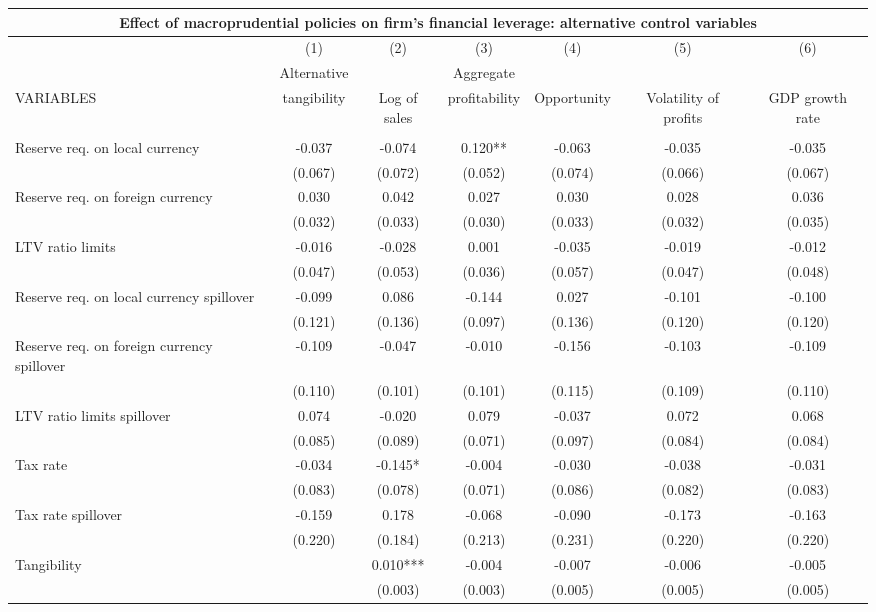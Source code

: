 \begin{tabular}{lcccccc}
\multicolumn{7}{c}{Effect of macroprudential policies on firm's financial leverage: alternative control variables} \\ \hline
 & (1) & (2) & (3) & (4) & (5) & (6) \\
 & Alternative &  & Aggregate &  &  &  \\
VARIABLES & tangibility & Log of sales & profitability & Opportunity & Volatility of profits & GDP growth rate \\ \hline
 &  &  &  &  &  &  \\
Reserve req. on local currency & -0.037 & -0.074 & 0.120** & -0.063 & -0.035 & -0.035 \\
 & (0.067) & (0.072) & (0.052) & (0.074) & (0.066) & (0.067) \\
Reserve req. on foreign currency & 0.030 & 0.042 & 0.027 & 0.030 & 0.028 & 0.036 \\
 & (0.032) & (0.033) & (0.030) & (0.033) & (0.032) & (0.035) \\
LTV ratio limits & -0.016 & -0.028 & 0.001 & -0.035 & -0.019 & -0.012 \\
 & (0.047) & (0.053) & (0.036) & (0.057) & (0.047) & (0.048) \\
Reserve req. on local currency spillover & -0.099 & 0.086 & -0.144 & 0.027 & -0.101 & -0.100 \\
 & (0.121) & (0.136) & (0.097) & (0.136) & (0.120) & (0.120) \\
Reserve req. on foreign currency spillover & -0.109 & -0.047 & -0.010 & -0.156 & -0.103 & -0.109 \\
 & (0.110) & (0.101) & (0.101) & (0.115) & (0.109) & (0.110) \\
LTV ratio limits spillover & 0.074 & -0.020 & 0.079 & -0.037 & 0.072 & 0.068 \\
 & (0.085) & (0.089) & (0.071) & (0.097) & (0.084) & (0.084) \\
Tax rate & -0.034 & -0.145* & -0.004 & -0.030 & -0.038 & -0.031 \\
 & (0.083) & (0.078) & (0.071) & (0.086) & (0.082) & (0.083) \\
Tax rate spillover & -0.159 & 0.178 & -0.068 & -0.090 & -0.173 & -0.163 \\
 & (0.220) & (0.184) & (0.213) & (0.231) & (0.220) & (0.220) \\
Tangibility &  & 0.010*** & -0.004 & -0.007 & -0.006 & -0.005 \\
 &  & (0.003) & (0.003) & (0.005) & (0.005) & (0.005) \\

\end{tabular}
